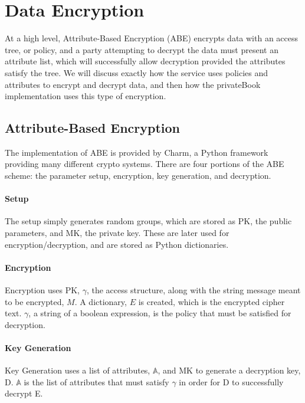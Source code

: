 \documentclass[12pt]{article}
\begin{document}
\section{Data Encryption}
At a high level, Attribute-Based Encryption (ABE) encrypts data with an access tree, or policy, and a party attempting to decrypt the data must present an attribute list, which will successfully allow decryption provided the attributes satisfy the tree. We will discuss exactly how the service uses policies and attributes to encrypt and decrypt data, and then how the privateBook implementation uses this type of encryption.

\subsection{Attribute-Based Encryption}
The implementation of ABE is provided by Charm, a Python framework providing many different crypto systems. There are four portions of the ABE scheme: the parameter setup, encryption, key generation, and decryption. 
\paragraph{Setup}
The setup simply generates random groups, which are stored as PK, the public parameters, and MK, the private key. These are later used for encryption/decryption, and are stored as Python dictionaries.
\paragraph{Encryption}
Encryption uses PK, $\gamma$, the access structure, along with the string message meant to be encrypted, $M$. A dictionary, $E$ is created, which is the encrypted cipher text. $\gamma$, a string of a boolean expression, is the policy that must be satisfied for decryption.
\paragraph{Key Generation}
Key Generation uses a list of attributes, $\mathbb{A}$, and MK to generate a decryption key, D. $\mathbb{A}$ is the list of attributes that must satisfy $\gamma$ in order for D to successfully decrypt E. 
\end{document}
